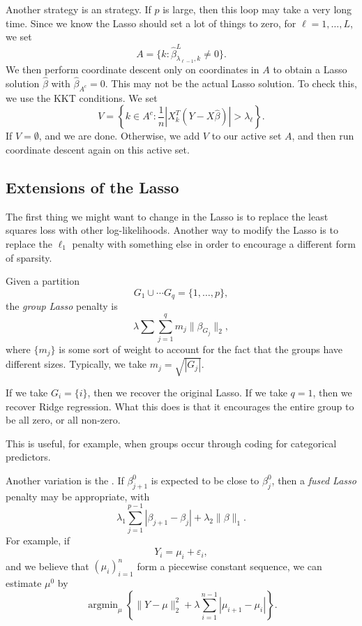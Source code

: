 \documentclass[a4paper]{article}
\DeclareMathOperator*\argmin{argmin}
\begin{document}
Another strategy is an  strategy. If $p$ is large, then this loop may take a very long time. Since we know the Lasso should set a lot of things to zero, for $\ell = 1, \ldots, L$, we set
\[
  A = \{ k : \hat{\beta}^L_{\lambda_{\ell - 1}, k} \not= 0 \}.
\]
We then perform coordinate descent only on coordinates in $A$ to obtain a Lasso solution $\hat{\beta}$ with $\hat{\beta}_{A^c} = 0$. This may not be the actual Lasso solution. To check this, we use the KKT conditions. We set
\[
  V = \left\{k \in A^c: \frac{1}{n} |X_k^T(Y - X \hat{\beta})| > \lambda_\ell \right\}.
\]
If $V = \emptyset$, and we are done. Otherwise, we add $V$ to our active set $A$, and then run coordinate descent again on this active set.

\subsection{Extensions of the Lasso}
The first thing we might want to change in the Lasso is to replace the least squares loss with other log-likelihoods. Another way to modify the Lasso is to replace the $\ell_1$ penalty with something else in order to encourage a different form of sparsity.

\begin{eg}
  Given a partition
  \[
    G_1 \cup \cdots G_q = \{1, \ldots, p\},
  \]
  the \emph{group Lasso} penalty is
  \[
    \lambda \sum \sum_{j = 1}^q m_j \|\beta_{G_j}\|_2,
  \]
  where $\{m_j\}$ is some sort of weight to account for the fact that the groups have different sizes. Typically, we take $m_j = \sqrt{|G_j|}$.

  If we take $G_i = \{i\}$, then we recover the original Lasso. If we take $q = 1$, then we recover Ridge regression. What this does is that it encourages the entire group to be all zero, or all non-zero.

  This is useful, for example, when groups occur through coding for categorical predictors.
\end{eg}

\begin{eg}
  Another variation is the . If $\beta^0_{j + 1}$ is expected to be close to $\beta_j^0$, then a \emph{fused Lasso} penalty may be appropriate, with
  \[
    \lambda_1 \sum_{j = 1}^{p - 1} |\beta_{j + 1} - \beta_j| + \lambda_2 \|\beta\|_1.
  \]
  For example, if
  \[
    Y_i = \mu_i + \varepsilon_i,
  \]
  and we believe that $(\mu_i)_{i = 1}^n$ form a piecewise constant sequence, we can estimate $\mu^0$ by
  \[
    \argmin_\mu \left\{\|Y - \mu\|_2^2 + \lambda \sum_{i = 1}^{n - 1} |\mu_{i + 1} - \mu_i|\right\}.
  \]
\end{eg}
\end{document}
